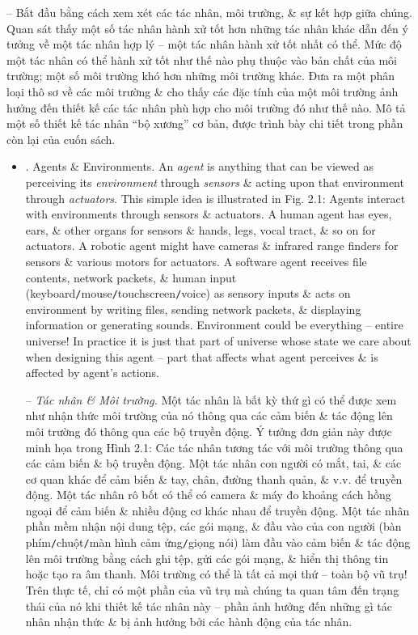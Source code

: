 \documentclass{article}
\begin{document}
\begin{itemize}
\begin{itemize}
		-- Bắt đầu bằng cách xem xét các tác nhân, môi trường, \& sự kết hợp giữa chúng. Quan sát thấy một số tác nhân hành xử tốt hơn những tác nhân khác dẫn đến ý tưởng về một tác nhân hợp lý -- một tác nhân hành xử tốt nhất có thể. Mức độ một tác nhân có thể hành xử tốt như thế nào phụ thuộc vào bản chất của môi trường; một số môi trường khó hơn những môi trường khác. Đưa ra một phân loại thô sơ về các môi trường \& cho thấy các đặc tính của một môi trường ảnh hưởng đến thiết kế các tác nhân phù hợp cho môi trường đó như thế nào. Mô tả một số thiết kế tác nhân ``bộ xương'' cơ bản, được trình bày chi tiết trong phần còn lại của cuốn sách.
		\begin{itemize}
			\item {. Agents \& Environments.} An {\it agent} is anything that can be viewed as perceiving its {\it environment} through {\it sensors} \& acting upon that environment through {\it actuators}. This simple idea is illustrated in {\sf Fig. 2.1: Agents interact with environments through sensors \& actuators}. A human agent has eyes, ears, \& other organs for sensors \& hands, legs, vocal tract, \& so on for actuators. A robotic agent might have cameras \& infrared range finders for sensors \& various motors for actuators. A software agent receives file contents, network packets, \& human input (keyboard{\tt/}mouse{\tt/}touchscreen{\tt/}voice) as sensory inputs \& acts on environment by writing files, sending network packets, \& displaying information or generating sounds. Environment could be everything -- entire universe! In practice it is just that part of universe whose state we care about when designing this agent -- part that affects what agent perceives \& is affected by agent's actions.
			
			-- {\it Tác nhân \& Môi trường.} Một tác nhân là bất kỳ thứ gì có thể được xem như nhận thức môi trường của nó thông qua các cảm biến \& tác động lên môi trường đó thông qua các bộ truyền động. Ý tưởng đơn giản này được minh họa trong {\sf Hình 2.1: Các tác nhân tương tác với môi trường thông qua các cảm biến \& bộ truyền động}. Một tác nhân con người có mắt, tai, \& các cơ quan khác để cảm biến \& tay, chân, đường thanh quản, \& v.v. để truyền động. Một tác nhân rô bốt có thể có camera \& máy đo khoảng cách hồng ngoại để cảm biến \& nhiều động cơ khác nhau để truyền động. Một tác nhân phần mềm nhận nội dung tệp, các gói mạng, \& đầu vào của con người (bàn phím{\tt/}chuột{\tt/}màn hình cảm ứng{\tt/}giọng nói) làm đầu vào cảm biến \& tác động lên môi trường bằng cách ghi tệp, gửi các gói mạng, \& hiển thị thông tin hoặc tạo ra âm thanh. Môi trường có thể là tất cả mọi thứ -- toàn bộ vũ trụ! Trên thực tế, chỉ có một phần của vũ trụ mà chúng ta quan tâm đến trạng thái của nó khi thiết kế tác nhân này -- phần ảnh hưởng đến những gì tác nhân nhận thức \& bị ảnh hưởng bởi các hành động của tác nhân.
			

\end{itemize}
\end{itemize}
\end{itemize}
\end{document}
